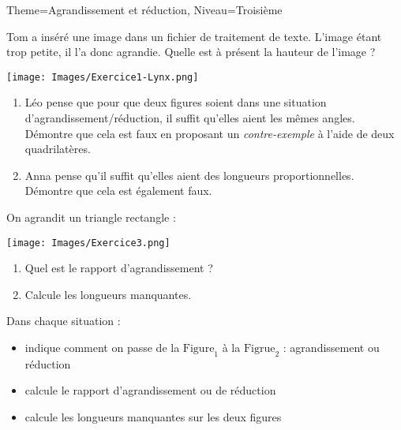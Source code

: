 \documentclass[11pt]{article}
\begin{document}
\begin{Maquette}[Fiche]{Theme=Agrandissement et réduction, Niveau=Troisième}

   \begin{exercice}
      Tom a inséré une image dans un fichier de traitement de texte. L’image étant trop petite, il l’a donc agrandie. Quelle est à présent la hauteur de l’image ?
      \begin{center}
         \texttt{[image: Images/Exercice1-Lynx.png]}
      \end{center}
   \end{exercice}

   \begin{multicols}{2}

      \begin{exercice}
         \begin{enumerate}
            \item Léo pense que pour que deux figures soient dans une situation d’agrandissement/réduction, il suffit qu’elles aient les mêmes angles. Démontre que cela est faux en proposant un \emph{contre-exemple} à l’aide de deux quadrilatères.
            \item Anna pense qu’il suffit qu’elles aient des longueurs proportionnelles. Démontre que cela est également faux.
         \end{enumerate}

      \end{exercice}

      \begin{exercice}
         On agrandit un triangle rectangle :
         \begin{center}
            \texttt{[image: Images/Exercice3.png]}
         \end{center}
         \begin{enumerate}
            \item Quel est le rapport d’agrandissement ?
            \item Calcule les longueurs manquantes.
         \end{enumerate}
      \end{exercice}
   \end{multicols}
   \newpage

   \begin{multicols}{2}
      \begin{exercice}
         Dans chaque situation :
         \begin{itemize}
            \item indique comment on passe de la $\textrm{Figure}_1$ à la $\textrm{Figrue}_2$ : agrandissement ou réduction
            \item calcule le rapport d’agrandissement ou de réduction
            \item calcule les longueurs manquantes sur les deux figures
         \end{itemize}


\end{exercice}
\end{multicols}
\end{Maquette}
\end{document}
